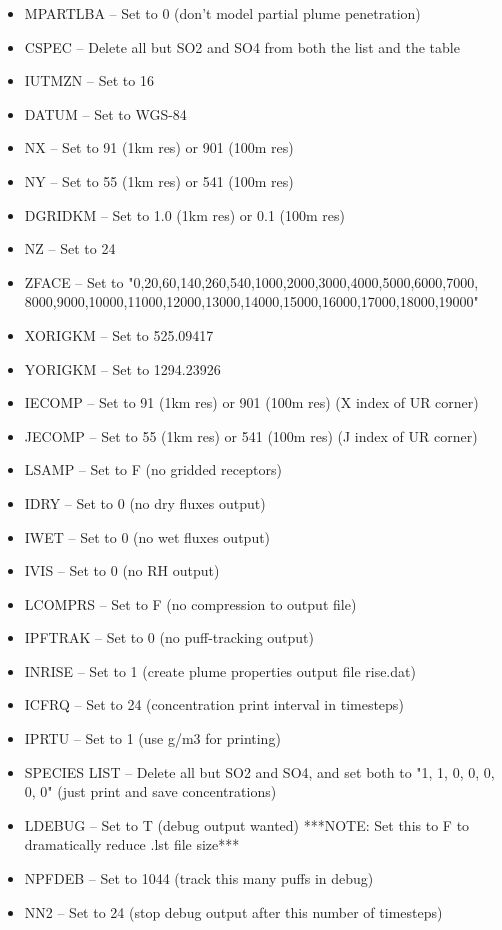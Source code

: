\documentclass[10pt,a4paper]{article}
\begin{document}
\begin{itemize}
\begin{itemize}
\item MPARTLBA -- Set to 0 (don't model partial plume penetration)
\item CSPEC -- Delete all but SO2 and SO4 from both the list and the table
\item IUTMZN -- Set to 16
\item DATUM -- Set to WGS-84
\item NX -- Set to 91 (1km res) or 901 (100m res)
\item NY -- Set to 55 (1km res) or 541 (100m res)
\item DGRIDKM -- Set to 1.0 (1km res) or 0.1 (100m res)
\item NZ -- Set to 24
\item ZFACE -- Set to "0,20,60,140,260,540,1000,2000,3000,4000,5000,6000,7000, 8000,9000,10000,11000,12000,13000,14000,15000,16000,17000,18000,19000"
\item XORIGKM -- Set to 525.09417
\item YORIGKM -- Set to 1294.23926
\item IECOMP -- Set to 91 (1km res) or 901 (100m res) (X index of UR corner)
\item JECOMP -- Set to 55 (1km res) or 541 (100m res) (J index of UR corner)
\item LSAMP -- Set to F (no gridded receptors)
\item IDRY -- Set to 0 (no dry fluxes output)
\item IWET -- Set to 0 (no wet fluxes output)
\item IVIS -- Set to 0 (no RH output)
\item LCOMPRS -- Set to F (no compression to output file)
\item IPFTRAK -- Set to 0 (no puff-tracking output)
\item INRISE -- Set to 1 (create plume properties output file rise.dat)
\item ICFRQ -- Set to 24 (concentration print interval in timesteps)
\item IPRTU -- Set to 1 (use g/m3 for printing)
\item SPECIES LIST -- Delete all but SO2 and SO4, and set both to "1, 1, 0, 0, 0, 0, 0" (just print and save concentrations)
\item LDEBUG -- Set to T (debug output wanted) ***NOTE: Set this to F to dramatically reduce .lst file size***
\item NPFDEB -- Set to 1044 (track this many puffs in debug)
\item NN2 -- Set to 24 (stop debug output after this number of timesteps)

\end{itemize}
\end{itemize}
\end{document}
